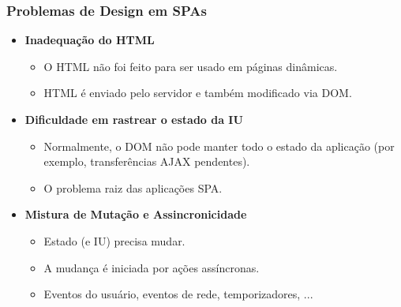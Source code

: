 \documentclass{beamer}
\begin{document}
\begin{frame}
      \frametitle{Problemas de Design em SPAs}

      \begin{itemize}
            \item \textbf{Inadequação do HTML}
                  \begin{itemize}
                        \item O HTML não foi feito para ser usado em páginas dinâmicas.
                        \item HTML é enviado pelo servidor e também modificado via DOM.
                  \end{itemize}

            \item \textbf{Dificuldade em rastrear o estado da IU}
                  \begin{itemize}
                        \item Normalmente, o DOM não pode manter todo o estado da aplicação (por exemplo, transferências AJAX pendentes).
                        \item O problema raiz das aplicações SPA.
                  \end{itemize}

            \item \textbf{Mistura de Mutação e Assincronicidade}
                  \begin{itemize}
                        \item Estado (e IU) precisa mudar.
                        \item A mudança é iniciada por ações assíncronas.
                        \item Eventos do usuário, eventos de rede, temporizadores, ...
                  \end{itemize}
      \end{itemize}

\end{frame}
\end{document}
